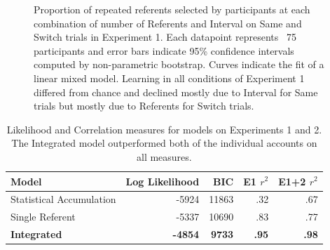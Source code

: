 \documentclass[man,floatsintext]{apa6}
\begin{document}
 \begin{figure}[!t]
	\caption{\label{fig:exp1_2_data} Proportion of repeated referents selected by participants at each combination of number of Referents and Interval on Same and Switch trials in Experiment 1. Each datapoint represents ~75 participants  and error bars indicate 95\% confidence intervals computed by non-parametric bootstrap. Curves indicate the fit of a linear mixed model. Learning in all conditions of Experiment 1 differed from chance and declined mostly due to Interval for Same trials but mostly due to Referents for Switch trials.} 
\end{figure}

\begin{table}
\begin{center}
\begin{tabular}{lrrrr}
\hline
Model & Log Likelihood &BIC & E1 $r^{2}$ & E1+2 $r^{2}$ \\
\hline
Statistical Accumulation & -5924 & 11863 & .32  & .67\\
Single Referent & -5337 & 10690 & .83 & .77 \\
\textbf{Integrated} & \textbf{-4854} & \textbf{9733} & \textbf{.95}  & \textbf{.98}\\
\hline
\end{tabular}
\end{center}
\caption{\label{tab:model}Likelihood and Correlation measures for models on Experiments 1 and 2. The Integrated model outperformed both of the individual accounts on all measures.}
\end{table}


\end{document}
